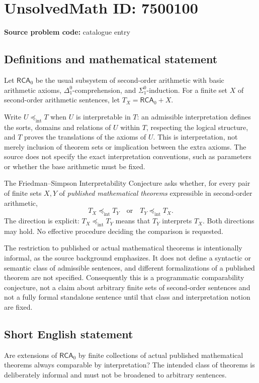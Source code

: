 \documentclass[11pt]{article}
\begin{document}
\section*{UnsolvedMath ID: 7500100}
\textbf{Source problem code:} catalogue entry
\subsection{Definitions and mathematical statement}
Let \(\mathsf{RCA}_0\) be the usual subsystem of second-order arithmetic with basic arithmetic axioms, \(\Delta^0_1\)-comprehension, and \(\Sigma^0_1\)-induction. For a finite set \(X\) of second-order arithmetic sentences, let \(T_X=\mathsf{RCA}_0+X\).

Write \(U\preccurlyeq_{\mathrm{int}}T\) when \(U\) is interpretable in \(T\): an admissible interpretation defines the sorts, domains and relations of \(U\) within \(T\), respecting the logical structure, and \(T\) proves the translations of the axioms of \(U\). This is interpretation, not merely inclusion of theorem sets or implication between the extra axioms. The source does not specify the exact interpretation conventions, such as parameters or whether the base arithmetic must be fixed.

The Friedman--Simpson Interpretability Conjecture asks whether, for every pair of finite sets \(X,Y\) of \emph{published mathematical theorems} expressible in second-order arithmetic,
\[
 T_X\preccurlyeq_{\mathrm{int}}T_Y
 \quad\text{or}\quad
 T_Y\preccurlyeq_{\mathrm{int}}T_X.
\]
The direction is explicit: \(T_X\preccurlyeq_{\mathrm{int}}T_Y\) means that \(T_Y\) interprets \(T_X\). Both directions may hold. No effective procedure deciding the comparison is requested.

The restriction to published or actual mathematical theorems is intentionally informal, as the source background emphasizes. It does not define a syntactic or semantic class of admissible sentences, and different formalizations of a published theorem are not specified. Consequently this is a programmatic comparability conjecture, not a claim about arbitrary finite sets of second-order sentences and not a fully formal standalone sentence until that class and interpretation notion are fixed.
\subsection{Short English statement}
Are extensions of \(\mathsf{RCA}_0\) by finite collections of actual published mathematical theorems always comparable by interpretation? The intended class of theorems is deliberately informal and must not be broadened to arbitrary sentences.
\end{document}
